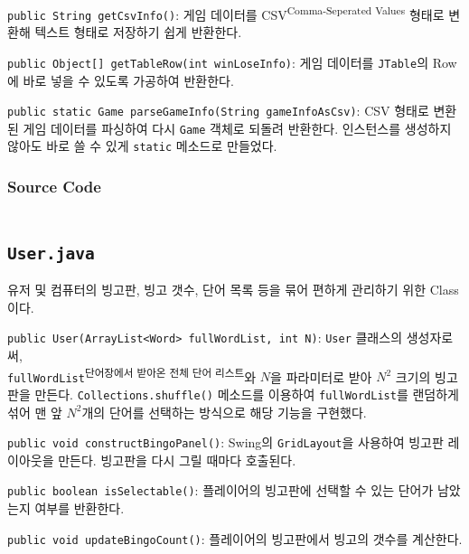 \texttt{public String getCsvInfo()}:
게임 데이터를 CSV\textsuperscript{Comma-Seperated Values} 형태로 변환해 텍스트 형태로 저장하기 쉽게 반환한다.

\texttt{public Object[] getTableRow(int winLoseInfo)}:
게임 데이터를 \texttt{JTable}의 Row에 바로 넣을 수 있도록 가공하여 반환한다.

\texttt{public static Game parseGameInfo(String gameInfoAsCsv)}:
CSV 형태로 변환된 게임 데이터를 파싱하여 다시 \texttt{Game} 객체로 되돌려 반환한다.
인스턴스를 생성하지 않아도 바로 쓸 수 있게 \texttt{static} 메소드로 만들었다.

\subsubsection{Source Code}
\inputminted[fontsize=\scriptsize]{java}{../../src/main/java/ywrhee/project/Game.java}

\newpage
\subsection{\texttt{User.java}}
유저 및 컴퓨터의 빙고판, 빙고 갯수, 단어 목록 등을 묶어 편하게 관리하기 위한 Class이다.

\texttt{public User(ArrayList<Word> fullWordList, int N)}:
\texttt{User} 클래스의 생성자로써,\\\texttt{fullWordList}\textsuperscript{단어장에서 받아온 전체 단어 리스트}와 $N$을 파라미터로 받아 $N^2$ 크기의 빙고판을 만든다.
\texttt{Collections.shuffle()} 메소드를 이용하여 \texttt{fullWordList}를 랜덤하게 섞어 맨 앞 $N^2$개의 단어를 선택하는 방식으로 해당 기능을 구현했다.

\texttt{public void constructBingoPanel()}:
Swing의 \texttt{GridLayout}을 사용하여 빙고판 레이아웃을 만든다. 빙고판을 다시 그릴 때마다 호출된다.

\texttt{public boolean isSelectable()}:
플레이어의 빙고판에 선택할 수 있는 단어가 남았는지 여부를 반환한다.

\texttt{public void updateBingoCount()}:
플레이어의 빙고판에서 빙고의 갯수를 계산한다.

